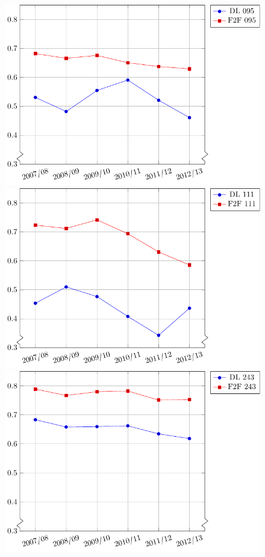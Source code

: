 \begin{figure}[!htb]
    \begin{minipage}{.3\textwidth}
          \includegraphics[width=\textwidth]{graphics/passRatesByModality095.pdf}
    \end{minipage}
    \begin{minipage}{.3\textwidth}
          \includegraphics[width=\textwidth]{graphics/passRatesByModality111.pdf}
    \end{minipage}
    \begin{minipage}{.3\textwidth}
          \includegraphics[width=\textwidth]{graphics/passRatesByModality243.pdf}

\end{minipage}
\end{figure}
